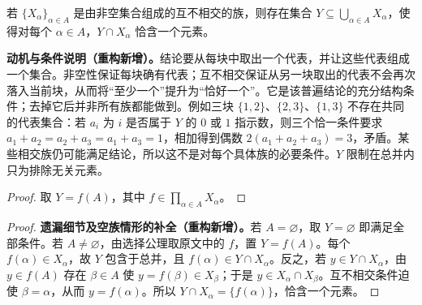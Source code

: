 \documentclass[../../main.tex]{subfiles}%
\begin{document}
\begin{corollary}\label{corollary:ch00-choice-representatives}
若 $\{X_\alpha\}_{\alpha\in A}$ 是由非空集合组成的互不相交的族，则存在集合 $Y\subseteq\bigcup_{\alpha\in A}X_\alpha$，使得对每个 $\alpha\in A$，$Y\cap X_\alpha$ 恰含一个元素。
\end{corollary}
\begin{remark}
\textbf{动机与条件说明（重构新增）。}结论要从每块中取出一个代表，并让这些代表组成一个集合。非空性保证每块确有代表；互不相交保证从另一块取出的代表不会再次落入当前块，从而将“至少一个”提升为“恰好一个”。它是该普遍结论的充分结构条件；去掉它后并非所有族都能做到。例如三块 $\{1,2\}$、$\{2,3\}$、$\{1,3\}$ 不存在共同的代表集合：若 $a_i$ 为 $i$ 是否属于 $Y$ 的 $0$ 或 $1$ 指示数，则三个恰一条件要求 $a_1+a_2=a_2+a_3=a_1+a_3=1$，相加得到偶数 $2(a_1+a_2+a_3)=3$，矛盾。某些相交族仍可能满足结论，所以这不是对每个具体族的必要条件。$Y$ 限制在总并内只为排除无关元素。
\end{remark}

\begin{proof}
取 $Y=f(A)$，其中 $f\in\prod\limits_{\alpha\in A}X_\alpha$。
\end{proof}
\begin{proof}
\textbf{遗漏细节及空族情形的补全（重构新增）。}若 $A=\varnothing$，取 $Y=\varnothing$ 即满足全部条件。若 $A\ne\varnothing$，由选择公理取原文中的 $f$，置 $Y=f(A)$。每个 $f(\alpha)\in X_\alpha$，故 $Y$ 包含于总并，且 $f(\alpha)\in Y\cap X_\alpha$。反之，若 $y\in Y\cap X_\alpha$，由 $y\in f(A)$ 存在 $\beta\in A$ 使 $y=f(\beta)\in X_\beta$；于是 $y\in X_\alpha\cap X_\beta$。互不相交条件迫使 $\beta=\alpha$，从而 $y=f(\alpha)$。所以 $Y\cap X_\alpha=\{f(\alpha)\}$，恰含一个元素。
\end{proof}
\end{document}
